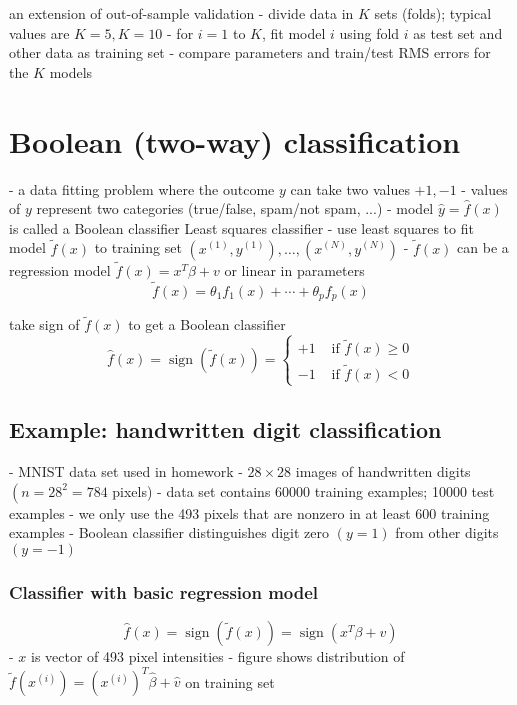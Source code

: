 an extension of out-of-sample validation
- divide data in $ K $ sets (folds); typical values are $ K=5, K=10 $
- for $ i=1 $ to $ K $, fit model $ i $ using fold $ i $ as test set and other data as training set
- compare parameters and train/test RMS errors for the $ K $ models

\section{Boolean (two-way) classification}

- a data fitting problem where the outcome $ y $ can take two values $ +1,-1 $
- values of $ y $ represent two categories (true/false, spam/not spam, ...)
- model $ \hat{y}=\hat{f}(x) $ is called a Boolean classifier
Least squares classifier
- use least squares to fit model $ \tilde{f}(x) $ to training set $ \left(x^{(1)}, y^{(1)}\right), \ldots,\left(x^{(N)}, y^{(N)}\right) $
- $ \tilde{f}(x) $ can be a regression model $ \tilde{f}(x)=x^{T} \beta+v $ or linear in parameters
$$
\tilde{f}(x)=\theta_{1} f_{1}(x)+\cdots+\theta_{p} f_{p}(x)
$$

take sign of $ \tilde{f}(x) $ to get a Boolean classifier
$$
\hat{f}(x)=\operatorname{sign}(\tilde{f}(x))=\left\{\begin{array}{ll}
+1 & \text { if } \tilde{f}(x) \geq 0 \\
-1 & \text { if } \tilde{f}(x)<0
\end{array}\right.
$$

\subsection{Example: handwritten digit classification}

- MNIST data set used in homework
- $ 28 \times 28 $ images of handwritten digits $ \left(n=28^{2}=784\right. $ pixels)
- data set contains 60000 training examples; 10000 test examples
- we only use the 493 pixels that are nonzero in at least 600 training examples
- Boolean classifier distinguishes digit zero $ (y=1) $ from other digits $ (y=-1) $

\subsubsection{Classifier with basic regression model}

$$
\hat{f}(x)=\operatorname{sign}(\tilde{f}(x))=\operatorname{sign}\left(x^{T} \beta+v\right)
$$
- $ x $ is vector of 493 pixel intensities
- figure shows distribution of $ \tilde{f}\left(x^{(i)}\right)=\left(x^{(i)}\right)^{T} \hat{\beta}+\hat{v} $ on training set

